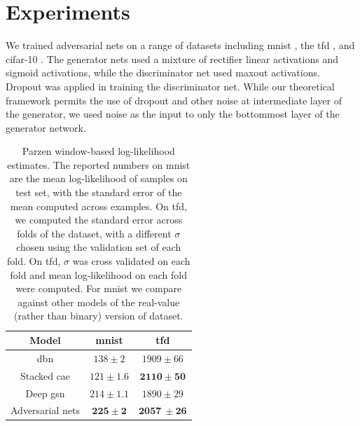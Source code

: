 \section{Experiments}

We trained adversarial nets on
a range of datasets including \acrshort{mnist} \cite{23_lecun1998gradient}, the \acrfull{tfd} \cite{28_susskind2010toronto}, and \acrshort{cifar-10} \cite{21_krizhevsky2009learning}. The generator nets used a mixture of rectifier linear activations \cite{19_5459469,9_pmlr-v15-glorot11a} and sigmoid activations, while the discriminator net used maxout \cite{10_goodfellow2013maxoutnetworks} activations. Dropout \cite{17_hinton2012improvingneuralnetworkspreventing} was applied in training the discriminator net. While our theoretical framework permits the use of dropout and other noise at intermediate layer of the generator, we used noise as the input to only the bottommost layer of the generator network.

\begin{table}[ht]
	\centering
	\begin{tabular}{c|c|c}
		Model & \acrshort{mnist} & \acrshort{tfd}\\
		\hline
		\acrshort{dbn} \cite{3_pmlr-v28-bengio13} & $138 \pm 2$ & $1909 \pm 66$\\
		Stacked \acrshort{cae} \cite{3_pmlr-v28-bengio13} & $121 \pm 1.6$ & $\boldsymbol{2110 \pm 50}$\\
		Deep \acrshort{gsn} \cite{6_pmlr-v32-bengio14} & $214 \pm 1.1$ & $1890 \pm 29$\\
		Adversarial nets & $\boldsymbol{225 \pm 2}$ & $\boldsymbol{2057\ \pm 26}$\\
	\end{tabular}
	\caption{Parzen window-based log-likelihood estimates. The reported numbers on \acrshort{mnist} are the mean log-likelihood of samples on test set, with the standard error of the mean computed across examples. On \acrshort{tfd}, we computed the standard error across folds of the dataset, with a different $\sigma$ chosen using the validation set of each fold. On \acrshort{tfd}, $\sigma$ was cross validated on each fold and mean log-likelihood on each fold were computed. For \acrshort{mnist} we compare against other models of the real-value (rather than binary) version of dataset.}
	\label{tab: table 1}
\end{table}

